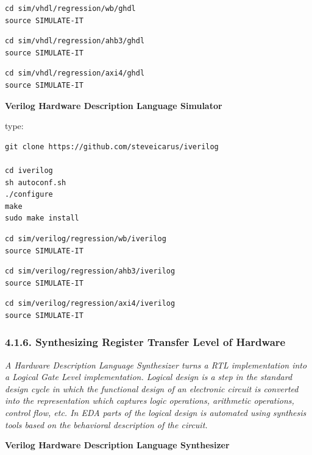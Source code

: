 \documentclass[]{article}
\begin{document}
\begin{verbatim}
cd sim/vhdl/regression/wb/ghdl
source SIMULATE-IT
\end{verbatim}

\begin{verbatim}
cd sim/vhdl/regression/ahb3/ghdl
source SIMULATE-IT
\end{verbatim}

\begin{verbatim}
cd sim/vhdl/regression/axi4/ghdl
source SIMULATE-IT
\end{verbatim}

\textbf{Verilog Hardware Description Language Simulator}

type:

\begin{verbatim}
git clone https://github.com/steveicarus/iverilog

cd iverilog
sh autoconf.sh
./configure
make
sudo make install
\end{verbatim}

\begin{verbatim}
cd sim/verilog/regression/wb/iverilog
source SIMULATE-IT
\end{verbatim}

\begin{verbatim}
cd sim/verilog/regression/ahb3/iverilog
source SIMULATE-IT
\end{verbatim}

\begin{verbatim}
cd sim/verilog/regression/axi4/iverilog
source SIMULATE-IT
\end{verbatim}

\subsubsection{4.1.6. Synthesizing Register Transfer Level of
Hardware}\label{synthesizing-register-transfer-level-of-hardware}

\emph{A Hardware Description Language Synthesizer turns a RTL
implementation into a Logical Gate Level implementation. Logical design
is a step in the standard design cycle in which the functional design of
an electronic circuit is converted into the representation which
captures logic operations, arithmetic operations, control flow, etc. In
EDA parts of the logical design is automated using synthesis tools based
on the behavioral description of the circuit.}

\textbf{Verilog Hardware Description Language Synthesizer}
\end{document}
